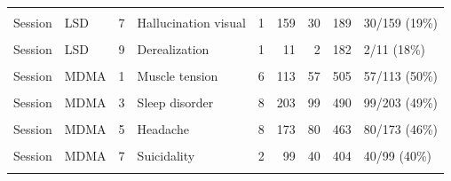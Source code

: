 \begin{table}[!h]
{\begin{tabular}[t]{llrlrrrrl}
\cellcolor{gray!10}{Session} & \cellcolor{gray!10}{LSD} & \cellcolor{gray!10}{6} & \cellcolor{gray!10}{Headache} & \cellcolor{gray!10}{4} & \cellcolor{gray!10}{241} & \cellcolor{gray!10}{56} & \cellcolor{gray!10}{232} & \cellcolor{gray!10}{56/241 (23\%)}\\
Session & LSD & 7 & Hallucination visual & 1 & 159 & 30 & 189 & 30/159 (19\%)\\
\cellcolor{gray!10}{Session} & \cellcolor{gray!10}{LSD} & \cellcolor{gray!10}{8} & \cellcolor{gray!10}{Affect liability} & \cellcolor{gray!10}{1} & \cellcolor{gray!10}{11} & \cellcolor{gray!10}{2} & \cellcolor{gray!10}{182} & \cellcolor{gray!10}{2/11 (18\%)}\\
Session & LSD & 9 & Derealization & 1 & 11 & 2 & 182 & 2/11 (18\%)\\
\cellcolor{gray!10}{Session} & \cellcolor{gray!10}{LSD} & \cellcolor{gray!10}{10} & \cellcolor{gray!10}{Chills} & \cellcolor{gray!10}{1} & \cellcolor{gray!10}{29} & \cellcolor{gray!10}{5} & \cellcolor{gray!10}{172} & \cellcolor{gray!10}{5/29 (17\%)}\\
\addlinespace
Session & MDMA & 1 & Muscle tension & 6 & 113 & 57 & 505 & 57/113 (50\%)\\
\cellcolor{gray!10}{Session} & \cellcolor{gray!10}{MDMA} & \cellcolor{gray!10}{2} & \cellcolor{gray!10}{Feeling cold} & \cellcolor{gray!10}{1} & \cellcolor{gray!10}{8} & \cellcolor{gray!10}{4} & \cellcolor{gray!10}{500} & \cellcolor{gray!10}{4/8 (50\%)}\\
Session & MDMA & 3 & Sleep disorder & 8 & 203 & 99 & 490 & 99/203 (49\%)\\
\cellcolor{gray!10}{Session} & \cellcolor{gray!10}{MDMA} & \cellcolor{gray!10}{4} & \cellcolor{gray!10}{Autonomic} & \cellcolor{gray!10}{4} & \cellcolor{gray!10}{114} & \cellcolor{gray!10}{55} & \cellcolor{gray!10}{483} & \cellcolor{gray!10}{55/114 (48\%)}\\
Session & MDMA & 5 & Headache & 8 & 173 & 80 & 463 & 80/173 (46\%)\\
\addlinespace
\cellcolor{gray!10}{Session} & \cellcolor{gray!10}{MDMA} & \cellcolor{gray!10}{6} & \cellcolor{gray!10}{Lack of appetite} & \cellcolor{gray!10}{6} & \cellcolor{gray!10}{150} & \cellcolor{gray!10}{69} & \cellcolor{gray!10}{461} & \cellcolor{gray!10}{69/150 (46\%)}\\
Session & MDMA & 7 & Suicidality & 2 & 99 & 40 & 404 & 40/99 (40\%)\\
\cellcolor{gray!10}{Session} & \cellcolor{gray!10}{MDMA} & \cellcolor{gray!10}{8} & \cellcolor{gray!10}{Anxiety} & \cellcolor{gray!10}{10} & \cellcolor{gray!10}{239} & \cellcolor{gray!10}{94} & \cellcolor{gray!10}{393} & \cellcolor{gray!10}{94/239 (39\%)}\\

\end{tabular}}
\end{table}
